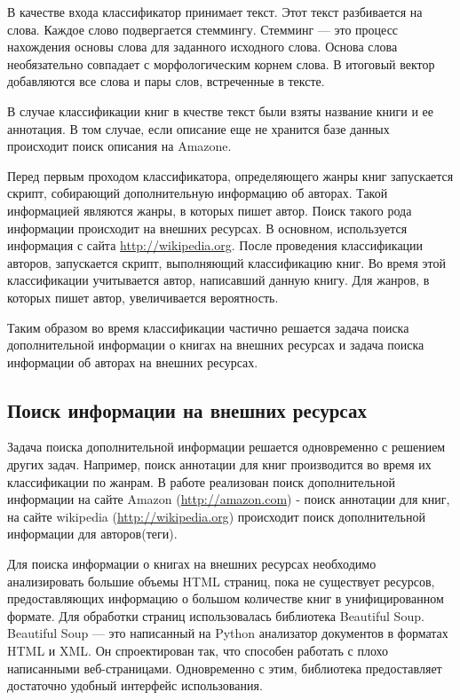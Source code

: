 \documentclass[a4paper]{report}
\begin{document}
В качестве входа классификатор принимает текст. Этот текст разбивается на слова. Каждое слово подвергается стеммингу. Стемминг --- это процесс нахождения основы слова для заданного исходного слова. Основа слова необязательно совпадает с морфологическим корнем слова. В итоговый вектор добавляются все слова и пары слов, встреченные в тексте.

В случае классификации книг в кчестве текст были взяты название книги и ее аннотация. В том случае, если описание  еще не хранится базе данных происходит поиск описания на Amazone.

Перед первым проходом классификатора, определяющего жанры книг запускается скрипт, собирающий дополнительную информацию об авторах. Такой информацией являются жанры, в которых пишет автор. Поиск такого рода информации происходит на внешних ресурсах. В основном, используется информация с сайта \url{http://wikipedia.org}. После проведения классификации авторов, запускается скрипт, выполняющий классификацию книг. Во время этой классификации учитывается автор, написавший данную книгу. Для жанров, в которых пишет автор, увеличивается вероятность.

Таким образом во время классификации частично решается задача поиска дополнительной информации о книгах на внешних ресурсах и задача поиска информации об авторах на внешних ресурсах.


\subsection{Поиск информации на внешних ресурсах}

Задача поиска дополнительной информации решается одновременно с решением других задач. Например, поиск аннотации для книг производится во время их классификации по жанрам.
В работе реализован поиск дополнительной информации на сайте Amazon (\url {http://amazon.com}) - поиск аннотации для книг, на сайте wikipedia (\url {http://wikipedia.org}) происходит поиск дополнительной информации для авторов(теги).

Для поиска информации о книгах на внешних ресурсах необходимо анализировать большие объемы HTML страниц, \tk пока не существует ресурсов, предоставляющих информацию о большом количестве книг в унифицированном формате. Для обработки страниц использовалась библиотека Beautiful Soup. Beautiful Soup --- это написанный на Python анализатор документов в форматах HTML и XML. Он спроектирован так, что способен работать с плохо написанными  веб-страницами. Одновременно с этим, библиотека предоставляет достаточно удобный интерфейс использования.
\end{document}

